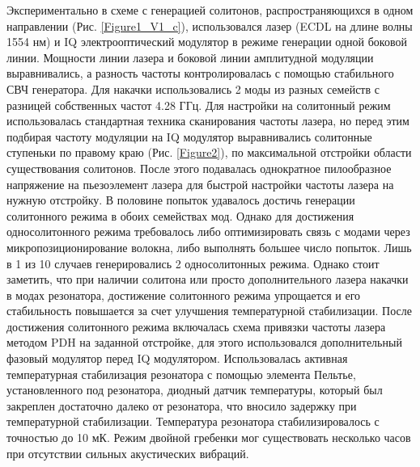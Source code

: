 Экспериментально в схеме с генерацией солитонов, распространяющихся в одном направлении (Рис. \ref{Figure1_V1_c}), использовался лазер (ECDL на длине волны 1554 нм) и IQ электрооптический модулятор в режиме генерации одной боковой линии. Мощности линии лазера и боковой линии амплитудной модуляции выравнивались, а разность частоты контролировалась с помощью стабильного СВЧ генератора. Для накачки использовались 2 моды из разных семейств с разницей собственных частот 4.28 ГГц. Для настройки на солитонный режим использовалась стандартная техника сканирования частоты лазера, но перед этим подбирая частоту модуляции на IQ модулятор выравнивались солитонные ступеньки по правому краю (Рис. \ref{Figure2}), по максимальной отстройки области существования солитонов. После этого подавалась однократное пилообразное напряжение на пьезоэлемент лазера для быстрой настройки частоты лазера на нужную отстройку. В половине попыток удавалось достичь генерации солитонного режима в обоих семействах мод. Однако для достижения односолитонного режима требовалось либо оптимизировать связь с модами через микропозиционирование волокна, либо выполнять большее число попыток. Лишь в 1 из 10 случаев генерировались 2 односолитонных режима. Однако стоит заметить, что при наличии солитона или просто дополнительного лазера накачки в модах резонатора, достижение солитонного режима упрощается и его стабильность повышается за счет улучшения температурной стабилизации. После достижения солитонного режима включалась схема привязки частоты лазера методом PDH на заданной отстройке, для этого использовался дополнительный фазовый модулятор перед IQ модулятором. Использовалась активная температурная стабилизация резонатора с помощью элемента Пельтье, установленного под резонатора, диодный датчик температуры, который был закреплен достаточно далеко от резонатора, что вносило задержку при температурной стабилизации. Температура резонатора стабилизировалось с точностью до 10 мК. Режим двойной гребенки мог существовать несколько часов при отсутствии сильных акустических вибраций.

